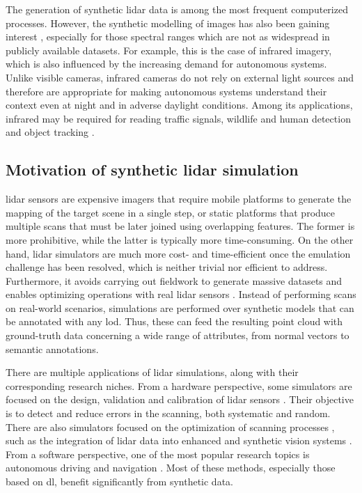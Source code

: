 The generation of synthetic \acrshort{lidar} data is among the most frequent computerized processes. However, the synthetic modelling of images has also been gaining interest \cite{yi_cycle_2023, ozkanoglu_infragan_2022}, especially for those spectral ranges which are not as widespread in publicly available datasets. For example, this is the case of infrared imagery, which is also influenced by the increasing demand for autonomous systems. Unlike visible cameras, infrared cameras do not rely on external light sources and therefore are appropriate for making autonomous systems understand their context even at night and in adverse daylight conditions. Among its applications, infrared may be required for reading traffic signals, wildlife and human detection and object tracking \cite{vollmer_infrared_2017}.  

\subsection{Motivation of synthetic \acrshort{lidar} simulation}

\acrshort{lidar} sensors are expensive imagers that require mobile platforms to generate the mapping of the target scene in a single step, or static platforms that produce multiple scans that must be later joined using overlapping features. The former is more prohibitive, while the latter is typically more time-consuming. On the other hand, \acrshort{lidar} simulators are much more cost- and time-efficient once the emulation challenge has been resolved, which is neither trivial nor efficient to address. Furthermore, it avoids carrying out fieldwork to generate massive datasets and enables optimizing operations with real \acrshort{lidar} sensors \cite{mohan_robust_2019, li_3d_2022}. Instead of performing scans on real-world scenarios, simulations are performed over synthetic models that can be annotated with any \acrshort{lod}. Thus, these can feed the resulting point cloud with ground-truth data concerning a wide range of attributes, from normal vectors to semantic annotations. 

There are multiple applications of \acrshort{lidar} simulations, along with their corresponding research niches. From a hardware perspective, some simulators are focused on the design, validation and calibration of \acrshort{lidar} sensors \cite{lee_validation_2020}. Their objective is to detect and reduce errors in the scanning, both systematic and random. There are also simulators focused on the optimization of scanning processes \cite{iqbal_simulation_2020, westling_simtreels_2020}, such as the integration of \acrshort{lidar} data into enhanced and synthetic vision systems \cite{peinecke_lidar_2008}. From a software perspective, one of the most popular research topics is autonomous driving \cite{fang_augmented_2020, li_deep_2020} and navigation \cite{manivasagam_lidarsim_2020}. Most of these methods, especially those based on \acrshort{dl}, benefit significantly from synthetic data. 

